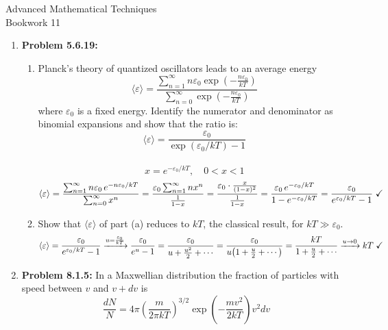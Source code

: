\documentclass{article}
\begin{document}
\thispagestyle{fancy}
\begin{center}\LARGE{Advanced Mathematical Techniques \\ Bookwork 11}\end{center}
\vspace{10mm}
\begin{enumerate}
    \item \textbf{Problem 5.6.19: }
    \begin{enumerate}
        \item Planck's theory of quantized oscillators leads to an average energy
        \[\langle \varepsilon \rangle = \frac{\sum_{n=1}^{\infty} n \varepsilon_0 \exp(-\frac{n\varepsilon_0}{kT})}{\sum_{n=0}^{\infty} \exp(-\frac{n\varepsilon_0}{kT})}\]
        where $\varepsilon_0$ is a fixed energy. Identify the numerator and denominator as binomial expansions and show that the ratio is:
        \[\langle \varepsilon \rangle = \frac{\varepsilon_0}{\exp(\varepsilon_0/kT)-1}\]
        \\
        \[x = e^{-\varepsilon_0/kT}, \quad 0 < x < 1\]
        \[\langle \varepsilon \rangle = \frac{\sum_{n=1}^{\infty} n\varepsilon_0\, e^{-n\varepsilon_0/kT}}{\sum_{n=0}^{\infty} x^n} 
            = \frac{\varepsilon_0 \sum_{n=1}^{\infty} n x^n}{{\frac{1}{1-x}}}
            = \frac{\varepsilon_0 \cdot \frac{x}{(1-x)^2}}{\frac{1}{1-x}} = \frac{\varepsilon_0\, e^{-\varepsilon_0/kT}}{1 - e^{-\varepsilon_0/kT}} 
            = \frac{\varepsilon_0}{e^{\varepsilon_0/kT} - 1} \hspace{1mm} \checkmark\]
        \item Show that $\langle \varepsilon \rangle$ of part (a) reduces to $kT$, the classical result, for $kT \gg \varepsilon_0$.
        \\
        \[
            \langle \varepsilon \rangle 
            = \frac{\varepsilon_0}{e^{\varepsilon_0/kT} - 1}
        \xrightarrow[]{u=\frac{\varepsilon_0}{kT}} \frac{\varepsilon_0}{e^u - 1} 
            = \frac{\varepsilon_0}{u + \frac{u^2}{2} + \cdots} 
            = \frac{\varepsilon_0}{u\!\left(1 + \frac{u}{2} + \cdots\right)}
            = \frac{kT}{1 + \frac{u}{2} + \cdots} 
            \xrightarrow{u \to 0} kT \hspace{1mm} \checkmark
        \]    \end{enumerate}
    \item \textbf{Problem 8.1.5: } In a Maxwellian distribution the fraction of particles with speed between $v$ and $v + dv$ is 
    \[\frac{dN}{N} = 4\pi \left( \frac{m}{2\pi kT} \right)^{3/2} \exp\left( -\frac{mv^2}{2kT} \right)v^2 dv\]

\end{enumerate}
\end{document}
